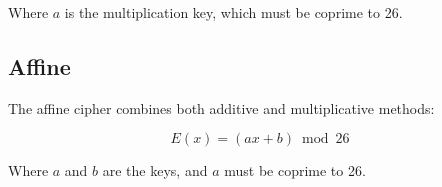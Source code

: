 \documentclass[12pt, letterpaper]{article}
\begin{document}
Where $a$ is the multiplication key, which must be coprime to 26.

\subsection{Affine}
The affine cipher combines both additive and multiplicative methods:

\begin{equation}
E(x) = (ax + b) \bmod 26
\end{equation}

Where $a$ and $b$ are the keys, and $a$ must be coprime to 26.



\end{document}
